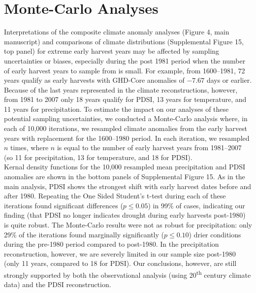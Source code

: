 \documentclass[12pt]{article}
\begin{document}
\section*{Monte-Carlo Analyses}
\noindent Interpretations of the composite climate anomaly analyses (Figure 4, main manuscript) and comparisons of climate distributions (Supplemental Figure 15, top panel) for extreme early harvest years may be affected by sampling uncertainties or biases, especially during the post 1981 period when the number of early harvest years to sample from is small. For example, from 1600--1981, 72 years qualify as early harvests with GHD-Core anomalies of $-7.67$ days or earlier. Because of the last years represented in the climate reconstructions, however, from 1981 to 2007 only 18 years qualify for PDSI, 13 years for temperature, and 11 years for precipitation. To estimate the impact on our analyses of these potential sampling uncertainties, we conducted a Monte-Carlo analysis where, in each of 10,000 iterations, we resampled climate anomalies from the early harvest years with replacement for the 1600--1980 period. In each iteration, we resampled $n$ times, where $n$ is equal to the number of early harvest years from 1981--2007 (so 11 for precipitation, 13 for temperature, and 18 for PDSI).\\
\indent Kernal density functions for the 10,000 resampled mean precipitation and PDSI anomalies are shown in the bottom panels of Supplemental Figure 15. As in the main analysis, PDSI shows the strongest shift with early harvest dates before and after 1980. Repeating the One Sided Student's t-test during each of these iterations found significant differences ($p\le0.05$) in 99\% of cases, indicating our finding (that PDSI no longer indicates drought during early harvests post-1980) is quite robust. The Monte-Carlo results were not as robust for precipitation: only 29\% of the iterations found marginally significantly ($p\le0.10$) drier conditions during the pre-1980 period compared to post-1980. In the precipitation reconstruction, however, we are severely limited in our sample size post-1980 (only 11 years, compared to 18 for PDSI). Our conclusions, however, are still strongly supported by both the observational analysis (using 20\textsuperscript{th} century climate data) and the PDSI reconstruction.


\end{document}

